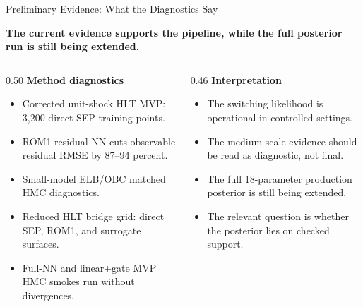 \documentclass[aspectratio=169,10pt]{beamer}
\newcommand{\claim}[1]{%
  \begin{center}
  \parbox{0.94\linewidth}{\centering\large\bfseries #1}
  \end{center}
}
\begin{document}
\begin{frame}{Preliminary Evidence: What the Diagnostics Say}
\claim{The current evidence supports the pipeline, while the full posterior run is still being extended.}

\vspace{0.45em}
\begin{columns}[T,onlytextwidth]
\begin{column}{0.50\textwidth}
\textbf{Method diagnostics}
\begin{itemize}
  \item Corrected unit-shock HLT MVP: 3,200 direct SEP training points.
  \item ROM1-residual NN cuts observable residual RMSE by 87--94 percent.
  \item Small-model ELB/OBC matched HMC diagnostics.
  \item Reduced HLT bridge grid: direct SEP, ROM1, and surrogate surfaces.
  \item Full-NN and linear+gate MVP HMC smokes run without divergences.
\end{itemize}
\end{column}
\begin{column}{0.46\textwidth}
\textbf{Interpretation}
\begin{itemize}
  \item The switching likelihood is operational in controlled settings.
  \item The medium-scale evidence should be read as diagnostic, not final.
  \item The full 18-parameter production posterior is still being extended.
  \item The relevant question is whether the posterior lies on checked support.
\end{itemize}
\end{column}
\end{columns}
\end{frame}
\end{document}
